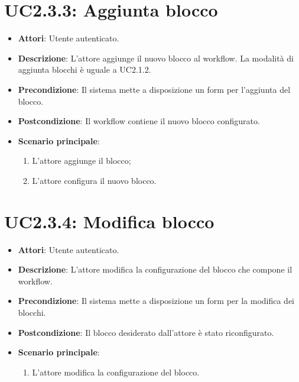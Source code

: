 \section{UC2.3.3: Aggiunta blocco}
\label{UC2.3.3}
\begin{itemize}
	\item \textbf{Attori}: Utente autenticato.
	\item \textbf{Descrizione}: L'attore aggiunge il nuovo blocco al workflow. La modalità di aggiunta blocchi è uguale a UC2.1.2.
	\item \textbf{Precondizione}: Il sistema mette a disposizione un form per l'aggiunta del blocco.
	\item \textbf{Postcondizione}: Il workflow contiene il nuovo blocco configurato.
	\item \textbf{Scenario principale}:
	\begin{enumerate} \item L'attore aggiunge il blocco;  \item  L'attore configura il nuovo blocco.\end{enumerate}
\end{itemize}

\section{UC2.3.4: Modifica blocco}
\label{UC2.3.4}
\begin{itemize}
	\item \textbf{Attori}: Utente autenticato.
	\item \textbf{Descrizione}: L'attore modifica la configurazione del blocco che compone il workflow.
	\item \textbf{Precondizione}: Il sistema mette a disposizione un form per la modifica dei blocchi.
	\item \textbf{Postcondizione}: Il blocco desiderato dall'attore è stato riconfigurato.
	\item \textbf{Scenario principale}:
	\begin{enumerate} \item L'attore modifica la configurazione del blocco.\end{enumerate}
\end{itemize}

